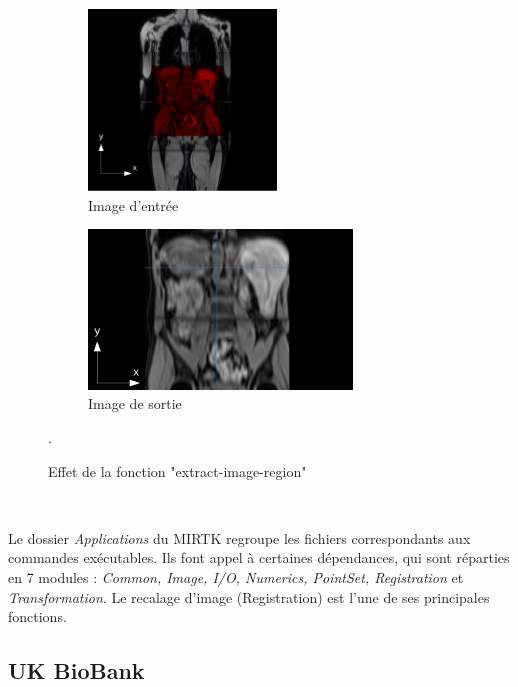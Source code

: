 \documentclass[10pt]{report}
\begin{document}
	\begin{figure}[h!]
		\centering
		\begin{subfigure}{.5\textwidth}
			\centering
			\includegraphics[width=5cm]{Reports/figures/mirtkextractregion1d.png}
			\caption{Image d'entrée}
			\label{Image d'entrée}
		\end{subfigure}%
		\begin{subfigure}{.5\textwidth}
			\centering
			\includegraphics[width=7cm]{Reports/figures/mirtkextractregion2_1d.png}
			\caption{Image de sortie}
			\label{Image de sortie}
		\end{subfigure}
		\caption{Effet de la fonction "extract-image-region"}.
		\label{Effet de la fonction "extract-image-region"}
	\end{figure}~\par
	
	Le dossier \textit{Applications} du MIRTK regroupe les fichiers correspondants aux commandes exécutables. Ils font appel à certaines dépendances, qui sont réparties en 7 modules : \textit{Common, Image, I/O, Numerics, PointSet, Registration} et \textit{Transformation}. 
	 Le recalage d'image (Registration) est l'une de ses principales fonctions.
	
	 \subsection{UK BioBank}~\par
\end{document}
